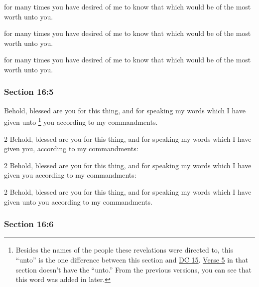 		\begin{framed}
		\scriptsize
			\begin{compactdesc}
				\item[JSP] for many times you have desired of me to know that which would be of the most worth unto you.
				\item[DC 1835] for many times you have desired of me to know that which would be of the most worth unto you.
				\item[DC 1844] for many times you have desired of me to know that which would be of the most worth unto you.
			\end{compactdesc}
		\end{framed}

	\subsubsection{Section 16:5} %
		\label{DC16-5}

		Behold, blessed are you for this thing, and for speaking my words which I have given unto%
			\footnote{%
				Besides the names of the people these revelations were directed to, this ``unto'' is the one difference between this section and \hyperref[DC15]{DC 15}. \hyperref[DC15-5]{Verse 5} in that section doesn't have the ``unto.'' From the previous versions, you can see that this word was added in later.
				}
		you according to my commandments.

		\begin{framed}
		\scriptsize
			\begin{compactdesc}
				\item[JSP] 2 Behold, blessed are you for this thing, and for speaking my words which I have given you, according to my commandments:
				\item[DC 1835] 2 Behold, blessed are you for this thing, and for speaking my words which I have given you according to my commandments:
				\item[DC 1844] 2 Behold, blessed are you for this thing, and for speaking my words which I have given unto you according to my commandments.
			\end{compactdesc}
		\end{framed}

	\subsubsection{Section 16:6} %
		\label{DC16-6}

